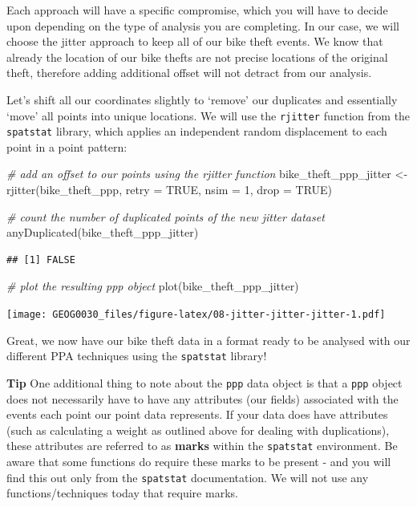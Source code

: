 \documentclass[
]{book}
\newenvironment{Shaded}{\begin{snugshade}}{\end{snugshade}}
\newcommand{\AttributeTok}[1]{\textcolor[rgb]{0.77,0.63,0.00}{#1}}
\newcommand{\CommentTok}[1]{\textcolor[rgb]{0.56,0.35,0.01}{\textit{#1}}}
\newcommand{\ConstantTok}[1]{\textcolor[rgb]{0.00,0.00,0.00}{#1}}
\newcommand{\DecValTok}[1]{\textcolor[rgb]{0.00,0.00,0.81}{#1}}
\newcommand{\FunctionTok}[1]{\textcolor[rgb]{0.00,0.00,0.00}{#1}}
\newcommand{\NormalTok}[1]{#1}
\newcommand{\OtherTok}[1]{\textcolor[rgb]{0.56,0.35,0.01}{#1}}
\begin{document}
Each approach will have a specific compromise, which you will have to decide upon depending on the type of analysis you are completing. In our case, we will choose the jitter approach to keep all of our bike theft events. We know that already the location of our bike thefts are not precise locations of the original theft, therefore adding additional offset will not detract from our analysis.

Let's shift all our coordinates slightly to `remove' our duplicates and essentially `move' all points into unique locations. We will use the \texttt{rjitter} function from the \texttt{spatstat} library, which applies an independent random displacement to each point in a point pattern:

\begin{Shaded}
\begin{Highlighting}[]
\CommentTok{\# add an offset to our points using the rjitter function}
\NormalTok{bike\_theft\_ppp\_jitter }\OtherTok{\textless{}{-}} \FunctionTok{rjitter}\NormalTok{(bike\_theft\_ppp, }\AttributeTok{retry =} \ConstantTok{TRUE}\NormalTok{, }\AttributeTok{nsim =} \DecValTok{1}\NormalTok{, }\AttributeTok{drop =} \ConstantTok{TRUE}\NormalTok{)}

\CommentTok{\# count the number of duplicated points of the new jitter dataset}
\FunctionTok{anyDuplicated}\NormalTok{(bike\_theft\_ppp\_jitter)}
\end{Highlighting}
\end{Shaded}

\begin{verbatim}
## [1] FALSE
\end{verbatim}

\begin{Shaded}
\begin{Highlighting}[]
\CommentTok{\# plot the resulting ppp object}
\FunctionTok{plot}\NormalTok{(bike\_theft\_ppp\_jitter)}
\end{Highlighting}
\end{Shaded}

\texttt{[image: GEOG0030\_files/figure-latex/08-jitter-jitter-jitter-1.pdf]}

Great, we now have our bike theft data in a format ready to be analysed with our different PPA techniques using the \texttt{spatstat} library!

\textbf{Tip}
One additional thing to note about the \texttt{ppp} data object is that a \texttt{ppp} object does not necessarily have to have any attributes (our fields) associated with the events each point our point data represents. If your data does have attributes (such as calculating a weight as outlined above for dealing with duplications), these attributes are referred to as \textbf{marks} within the \texttt{spatstat} environment. Be aware that some functions do require these marks to be present - and you will find this out only from the \texttt{spatstat} documentation. We will not use any functions/techniques today that require marks.
\end{document}
